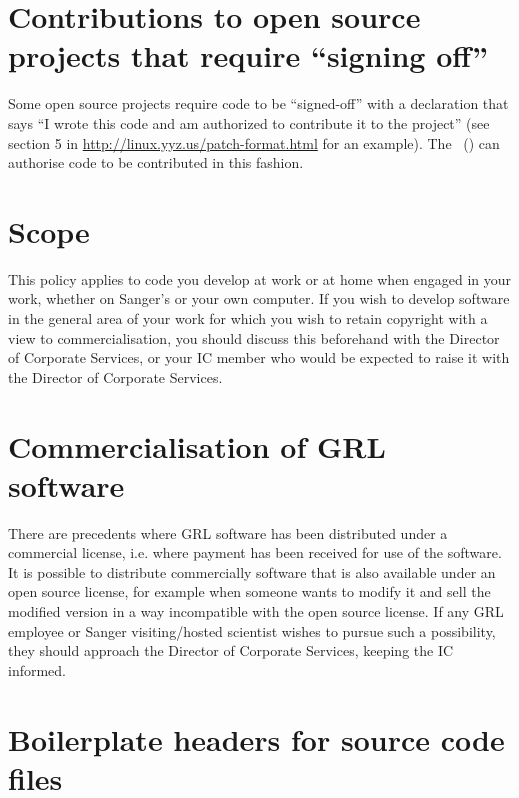 \documentclass[10pt,a4paper]{article}
\begin{document}
\section{Contributions to open source projects that require ``signing off''}

Some open source projects require code to be ``signed-off'' with a declaration that says ``I 
wrote this code and am authorized to contribute it to the project'' (see section 5 in 
\url{http://linux.yyz.us/patch-format.html} for an example). The \exectitle\ (\execperson) can authorise code to be contributed in this fashion. 


\section{Scope}

This policy applies to code you develop at work or at home when engaged in your 
work, whether on Sanger's or your own computer. If you wish to develop software in 
the general area of your work for which you wish to retain copyright with a view to 
commercialisation, you should discuss this beforehand with the Director of Corporate 
Services, or your IC member who would be expected to raise it with the Director of 
Corporate Services.


\section{Commercialisation of GRL software}

There are precedents where GRL software has been distributed under a commercial 
license, i.e. where payment has been received for use of the software. It is possible to 
distribute commercially software that is also available under an open source license, for 
example when someone wants to modify it and sell the modified version in a way 
incompatible with the open source license. If any GRL employee or Sanger 
visiting/hosted scientist wishes to pursue such a possibility, they should approach the 
Director of Corporate Services, keeping the IC informed. 


\appendix

\section{Boilerplate headers for source code files}
\end{document}
